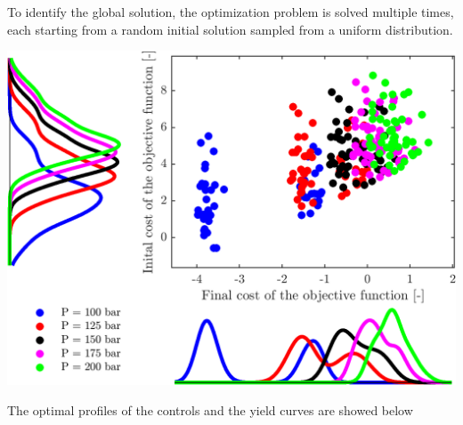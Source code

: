 \documentclass[a0,portrait]{a0poster}
\begin{document}
\begin{multicols}{2}
\begin{tcolorbox}[width=\linewidth, boxrule=0mm, sharp corners=all, colback=white]
	To identify the global solution, the optimization problem is solved multiple times, each starting from a random initial solution sampled from a uniform distribution. %
	
	\begin{center}\vspace{0.5cm}
		\includegraphics[width=\linewidth]{scatter.png}
	\end{center}%
	
	The optimal profiles of the controls and the yield curves are showed below
	

\end{tcolorbox}
\end{multicols}
\end{document}
